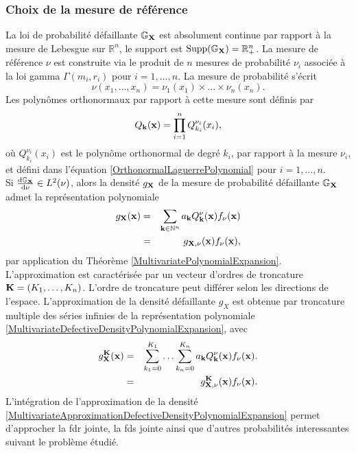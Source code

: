 \subsubsection{Choix de la mesure de référence}
La loi de probabilité défaillante $\mathbb{G}_{\bold{X}}$ est absolument continue par rapport à la mesure de Lebesgue sur $\mathbb{R}^{n}$, le support est $\text{Supp}(\mathbb{G}_{\bold{X}})=\mathbb{R}_{+}^{n}$. La mesure de référence $\nu$ est construite via le produit de $n$ mesures de probabilité $\nu_{i}$ associée à la loi gamma $\Gamma(m_{i},r_{i})$ pour $i=1,\ldots,n$. La mesure de probabilité s'écrit 
\begin{equation}\label{MultivariateReferenceProbabilityMeasure}
\nu(x_{1},\ldots,x_{n})=\nu_{1}(x_{1})\times\ldots\times\nu_{n}(x_{n}).
\end{equation}
Les polynômes orthonormaux par rapport à cette mesure sont définis par 
\begin{equation}
Q_{\bold{k}}(\bold{x})=\prod_{i=1}^{n}Q_{k_{i}}^{\nu_{i}}(x_{i}),
\end{equation}
où $Q_{k_{i}}^{\nu_{i}}(x_{i})$ est le polynôme orthonormal de degré $k_{i}$, par rapport à la mesure $\nu_{i}$, et défini dans l'équation \eqref{OrthonormalLaguerrePolynomial} pour $i=1,\ldots,n$. \\

Si $\frac{\text{d}\mathbb{G}_{\bold{X}}}{\text{d}\nu}\in L^{2}(\nu)$, alors la densité $g_{\bold{X}}$ de la mesure de probabilité défaillante $\mathbb{G}_{\bold{X}}$ admet la représentation polynomiale
\begin{eqnarray}
g_{\bold{X}}(\bold{x})&=&\sum_{\bold{k}\in\mathbb{N}^{n}}a_{\bold{k}}Q^{\nu}_{\bold{k}}(\bold{x})f_{\nu}(\bold{x})\label{MultivariateDefectiveDensityPolynomialExpansion}\\
&=&g_{\bold{X},\nu}(\bold{x})f_{\nu}(\bold{x}),\nonumber
\end{eqnarray}
par application du Théorème \ref{MultivariatePolynomialExpansion}. L'approximation est caractérisée par un vecteur d'ordres de troncature $\bold{K}=(K_{1},\ldots,K_{n})$. L'ordre de troncature peut différer selon les directions de l'espace. L'approximation de la densité défaillante $g_{X}$ est obtenue par troncature multiple des séries infinies de la représentation polynomiale \eqref{MultivariateDefectiveDensityPolynomialExpansion}, avec
\begin{eqnarray}
g_{\bold{X}}^{\bold{K}}(\bold{x})&=&\sum_{k_{1}=0}^{K_{1}}\ldots\sum_{k_{n}=0}^{K_{n}}a_{\bold{k}}Q^{\nu}_{\bold{k}}(\bold{x})f_{\nu}(\bold{x}).\label{MultivariateApproximationDefectiveDensityPolynomialExpansion}\\
&=&g_{\bold{X},\nu}^{\bold{K}}(\bold{x})f_{\nu}(\bold{x}).
\end{eqnarray}
L'intégration de l'approximation de la densité \eqref{MultivariateApproximationDefectiveDensityPolynomialExpansion} permet d'approcher la \gls{fdr} jointe, la \gls{fds} jointe ainsi que d'autres probabilités interessantes suivant le problème étudié. 
